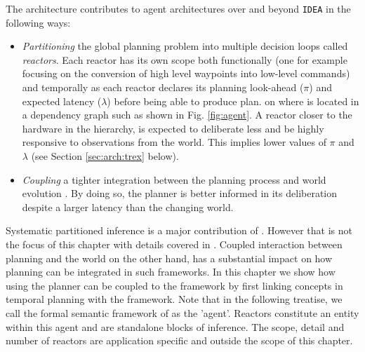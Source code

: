 The \rx architecture contributes to agent architectures over and
beyond \texttt{IDEA} in the following  ways:

\begin{itemize}

\item \emph{Partitioning} the global planning problem into multiple
  decision loops called {\em reactors}. Each reactor has its own scope
  both functionally (one for example focusing on the conversion of
  high level waypoints into low-level commands) and temporally as each
  reactor declares its planning look-ahead ($\pi$) and expected
  latency ($\lambda$) before being able to produce  plan.
   on where  is
  located in a dependency graph such as  shown in
  Fig. \ref{fig:agent}. A reactor closer to the hardware in the
  hierarchy, is expected to deliberate less and be highly responsive
  to observations from the world. This implies lower values of $\pi$
  and $\lambda$ (see Section \ref{sec:arch:trex} below). 

\item \emph{Coupling} a tighter integration between the planning
  process and world evolution . By doing so, the planner is better
  informed in its deliberation despite a larger latency than the
  changing world.
\end{itemize}

Systematic partitioned inference is a major contribution of
\rxe. However that is not the focus of this chapter with details
covered in \cite{py10, rajan12}. Coupled interaction between planning
and the world on the other hand, has a substantial impact on how
planning can be integrated in such frameworks. In this chapter we show
how using the \eu planner can be coupled to the \rx framework by first
linking concepts in temporal planning with the framework. Note that in
the following treatise, we call the formal semantic framework of \rx
as the 'agent'. Reactors constitute an entity within this agent and
are standalone blocks of inference. The scope, detail and number of
reactors are application specific and outside the scope of this
chapter.


